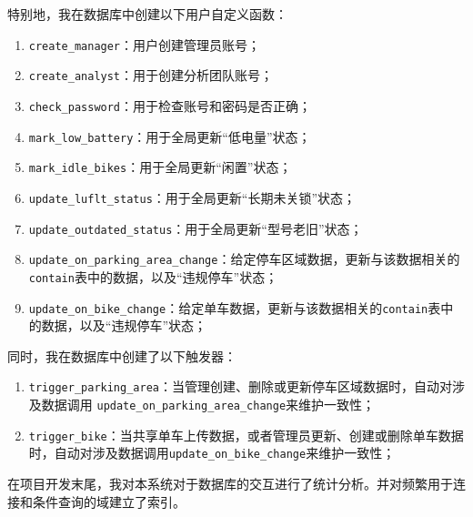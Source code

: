特别地，我在数据库中创建以下用户自定义函数：

\begin{enumerate}
    \item \texttt{create\_manager}：用户创建管理员账号；
    \item \texttt{create\_analyst}：用于创建分析团队账号；
    \item \texttt{check\_password}：用于检查账号和密码是否正确；
    \item \texttt{mark\_low\_battery}：用于全局更新“低电量”状态；
    \item \texttt{mark\_idle\_bikes}：用于全局更新“闲置”状态；
    \item \texttt{update\_luflt\_status}：用于全局更新“长期未关锁”状态；
    \item \texttt{update\_outdated\_status}：用于全局更新“型号老旧”状态；
    \item \texttt{update\_on\_parking\_area\_change}：给定停车区域数据，更新与该数据相关的\verb|contain|表中的数据，以及“违规停车”状态；
    \item \texttt{update\_on\_bike\_change}：给定单车数据，更新与该数据相关的\verb|contain|表中的数据，以及“违规停车”状态；
\end{enumerate}

同时，我在数据库中创建了以下触发器：

\begin{enumerate}
    \item \texttt{trigger\_parking\_area}：当管理创建、删除或更新停车区域数据时，自动对涉及数据调用 \texttt{update\_on\_parking\_area\_change}来维护一致性；
    \item \texttt{trigger\_bike}：当共享单车上传数据，或者管理员更新、创建或删除单车数据时，自动对涉及数据调用\texttt{update\_on\_bike\_change}来维护一致性；
\end{enumerate}

在项目开发末尾，我对本系统对于数据库的交互进行了统计分析。并对频繁用于连接和条件查询的域建立了索引。


